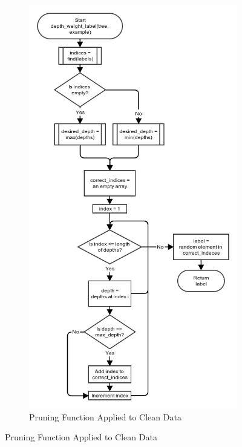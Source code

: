 \documentclass[11pt,a4paper]{article}
\begin{document}
\begin{figure}[!ht]
	\centering
	\begin{subfigure}[b]{0.495\textwidth}
		\includegraphics[width=\textwidth]{images/flow_chart/depth_weight_label.png}
     	\caption{Pruning Function Applied to Clean Data}
     	\label{fig:pruningClean}
    \end{subfigure}

\end{figure}
\end{document}
